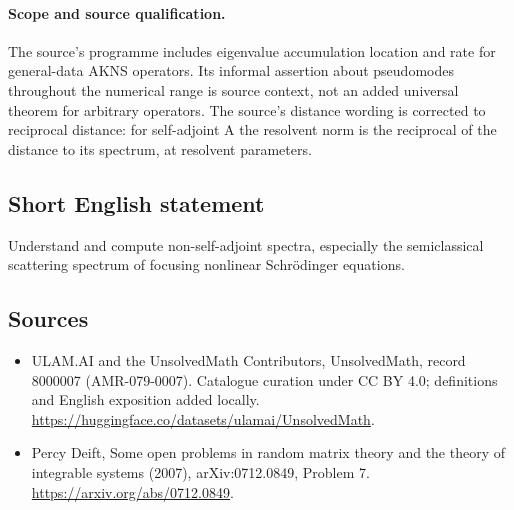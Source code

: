 \paragraph{Scope and source qualification.}The source’s programme includes eigenvalue accumulation location and rate for general-data AKNS operators. Its informal assertion about pseudomodes throughout the numerical range is source context, not an added universal theorem for arbitrary operators. The source’s distance wording is corrected to reciprocal distance: for self-adjoint A the resolvent norm is the reciprocal of the distance to its spectrum, at resolvent parameters.
\subsection{Short English statement}
Understand and compute non-self-adjoint spectra, especially the semiclassical scattering spectrum of focusing nonlinear Schrödinger equations.
\subsection{Sources}
\begin{itemize}
\item[\hypertarget{source:8000007:1}{S1}] ULAM.AI and the UnsolvedMath Contributors, UnsolvedMath, record 8000007 (AMR-079-0007). Catalogue curation under CC BY 4.0; definitions and English exposition added locally.
\url{https://huggingface.co/datasets/ulamai/UnsolvedMath}.
\item[\hypertarget{source:8000007:2}{S2}] Percy Deift, Some open problems in random matrix theory and the theory of integrable systems (2007), arXiv:0712.0849, Problem 7.
\url{https://arxiv.org/abs/0712.0849}.
\end{itemize}
\label{end:8000007}

